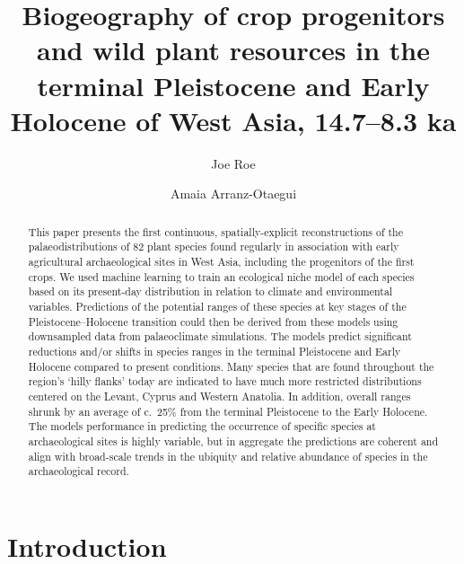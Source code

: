 \documentclass[
  authoryear,
  preprint]{elsarticle}
\begin{document}
\begin{frontmatter}
\title{Biogeography of crop progenitors and wild plant resources in the
terminal Pleistocene and Early Holocene of West Asia, 14.7--8.3 ka}
\author[1,2]{Joe Roe%
%
}
\author[3]{Amaia Arranz-Otaegui%
%
}





        
\begin{abstract}
This paper presents the first continuous, spatially-explicit
reconstructions of the palaeodistributions of 82 plant species found
regularly in association with early agricultural archaeological sites in
West Asia, including the progenitors of the first crops. We used machine
learning to train an ecological niche model of each species based on its
present-day distribution in relation to climate and environmental
variables. Predictions of the potential ranges of these species at key
stages of the Pleistocene--Holocene transition could then be derived
from these models using downsampled data from palaeoclimate simulations.
The models predict significant reductions and/or shifts in species
ranges in the terminal Pleistocene and Early Holocene compared to
present conditions. Many species that are found throughout the region's
`hilly flanks' today are indicated to have much more restricted
distributions centered on the Levant, Cyprus and Western Anatolia. In
addition, overall ranges shrunk by an average of c.~25\% from the
terminal Pleistocene to the Early Holocene. The models performance in
predicting the occurrence of specific species at archaeological sites is
highly variable, but in aggregate the predictions are coherent and align
with broad-scale trends in the ubiquity and relative abundance of
species in the archaeological record.
\end{abstract}





\end{frontmatter}
    

\section{Introduction}\label{introduction}
\end{document}
